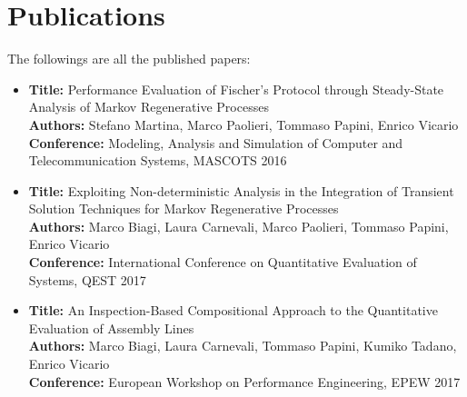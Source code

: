 
\section*{Publications}

  The followings are all the published papers:
  
  \begin{itemize}
    \item
      \textbf{Title:} Performance Evaluation of Fischer's Protocol through Steady-State Analysis of Markov Regenerative Processes \cite{martina2016performance}\\
      \textbf{Authors:} Stefano Martina, Marco Paolieri, Tommaso Papini, Enrico Vicario\\
      \textbf{Conference:} Modeling, Analysis and Simulation of Computer and Telecommunication Systems, MASCOTS 2016
    \item
      \textbf{Title:} Exploiting Non-deterministic Analysis in the Integration of Transient Solution Techniques for Markov Regenerative Processes \cite{biagi2017exploiting}\\
      \textbf{Authors:} Marco Biagi, Laura Carnevali, Marco Paolieri, Tommaso Papini, Enrico Vicario\\
      \textbf{Conference:} International Conference on Quantitative Evaluation of Systems, QEST 2017
    \item
      \textbf{Title:} An Inspection-Based Compositional Approach to the Quantitative Evaluation of Assembly Lines \cite{biagi2017inspection}\\
      \textbf{Authors:} Marco Biagi, Laura Carnevali, Tommaso Papini, Kumiko Tadano, Enrico Vicario\\
      \textbf{Conference:} European Workshop on Performance Engineering, EPEW 2017
  \end{itemize}

\newpage
